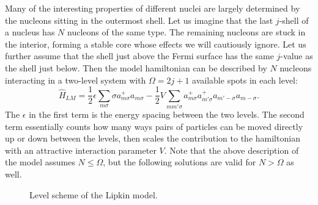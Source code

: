 \documentclass[prb,aps,twocolumn,showpacs,10pt]{revtex4-2}
\begin{document}
Many of the interesting properties of different nuclei are largely determined by the nucleons sitting in the outermost shell. Let us imagine that the last $j$-shell of a nucleus has $N$ nucleons of the same type. The remaining nucleons are stuck in the interior, forming a stable core whose effects we will cautiously ignore. Let us further assume that the shell just above the Fermi surface has the same $j$-value as the shell just below. Then the model hamiltonian can be described by $N$ nucleons interacting in a two-level system with $\Omega=2j+1$ available spots in each level:
\begin{equation}
\hat{H}_{LM} = \frac{1}{2} \epsilon \sum_{m \sigma} \sigma a_{m\sigma}^+ a_{m\sigma} - \frac{1}{2} V \sum_{m m' \sigma} a_{m\sigma}^+ a_{m'\sigma}^+ a_{m'-\sigma} a_{m-\sigma}.
\end{equation}
The $\epsilon$ in the first term is the energy spacing between the two levels. The second term essentially counts how many ways pairs of particles can be moved directly up or down between the levels, then scales the contribution to the hamiltonian with an attractive interaction parameter $V$. Note that the above description of the model assumes $N \leq \Omega$, but the following solutions are valid for $N > \Omega$ as well. 
\begin{figure}
\caption{Level scheme of the Lipkin model.}
\end{figure}
\end{document}
